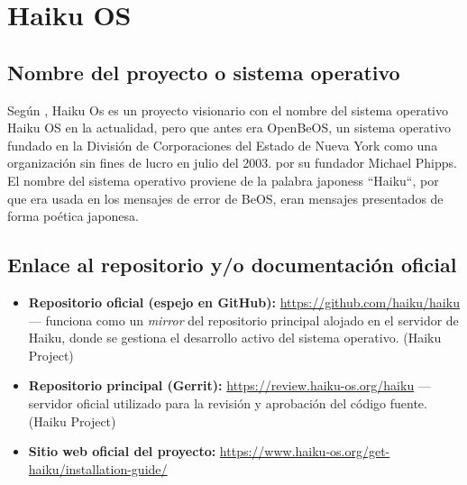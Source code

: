 \section{Haiku OS}

\subsection{Nombre del proyecto o sistema operativo}
Según \citep{leavengood2012haiku}, Haiku Os es un proyecto visionario con el nombre del sistema operativo Haiku OS en la actualidad, pero que antes era OpenBeOS, un sistema operativo fundado en la División de Corporaciones del Estado de Nueva York como una organización sin fines de lucro en julio del 2003. por su fundador Michael Phipps.
El nombre del sistema operativo proviene de la palabra japoness ``Haiku``, por que era usada en los mensajes de error de BeOS, eran mensajes presentados de forma poética japonesa.

\subsection{Enlace al repositorio y/o documentación oficial}
\begin{itemize}
    \item \textbf{Repositorio oficial (espejo en GitHub):} \url{https://github.com/haiku/haiku} — funciona como un \textit{mirror} del repositorio principal alojado en el servidor de Haiku, donde se gestiona el desarrollo activo del sistema operativo. (Haiku Project)
    \item \textbf{Repositorio principal (Gerrit):} \url{https://review.haiku-os.org/haiku} — servidor oficial utilizado para la revisión y aprobación del código fuente. (Haiku Project)
    \item \textbf{Sitio web oficial del proyecto:} \url{https://www.haiku-os.org/get-haiku/installation-guide/}
\end{itemize}

